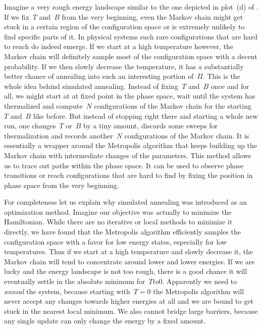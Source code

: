 Imagine a very rough energy landscape similar to the one depicted in plot~(d) of
. If we fix~$T$ and~$B$ from the very beginning, even
the Markov chain might get stuck in a certain region of the configuration space
or is extremely unlikely to find specific parts of it. In physical systems such
rare configurations that are hard to reach do indeed emerge. If we start at a
high temperature however, the Markov chain will definitely sample most of the
configuration space with a decent probability. If we then slowly decrease the
temperature, it has a substantially better chance of annealing into such an
interesting portion of~$\Pi$. This is the whole idea behind simulated annealing.
Instead of fixing~$T$ and~$B$ once and for all, we might start at at fixed point
in the phase space, wait until the system has thermalized and compute~$N$
configurations of the Markov chain for the starting~$T$ and~$B$ like before. But
instead of stopping right there and starting a whole new run, one changes~$T$
or~$B$ by a tiny amount, discards some sweeps for thermalization and records
another~$N$ configurations of the Markov chain. It is essentially a wrapper
around the Metropolis algorithm that keeps building up the Markov chain with
intermediate changes of the parameters.  This method allows us to trace out
paths within the phase space. It can be used to observe phase transitions or
reach configurations that are hard to find by fixing the position in phase space
from the very beginning.

For completeness let us explain why simulated annealing was introduced as an
optimization method.  Imagine our objective was actually to minimize the
Hamiltonian. While there are no iterative or local methods to minimize it
directly, we have found that the Metropolis algorithm efficiently samples the
configuration space with a favor for low energy states, especially for low
temperatures. Thus if we start at a high temperature and slowly decrease it, the
Markov chain will tend to concentrate around lower and lower energies. If we are
lucky and the energy landscape is not too rough, there is a good chance it will
eventually settle in the absolute minimum for~$T to 0$. Apparently we need to
\emph{anneal} the system, because starting with~$T=0$ the Metropolis algorithm
will never accept any changes towards higher energies at all and we are bound to
get stuck in the nearest local minimum. We also cannot bridge large barriers,
because any single update can only change the energy by a fixed amount.

